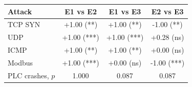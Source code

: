 \begin{tabular}{lccc}
\toprule
Attack & E1 vs E2 & E1 vs E3 & E2 vs E3\\
\midrule
TCP SYN & +1.00 (**) & +1.00 (**) & -1.00 (**)\\
UDP & +1.00 (***) & +1.00 (***) & +0.28 (ns)\\
ICMP & +1.00 (**) & +1.00 (**) & +0.00 (ns)\\
Modbus & +1.00 (***) & +0.00 (ns) & -1.00 (***)\\
\midrule
PLC crashes, $p$ & 1.000 & 0.087 & 0.087\\
\bottomrule
\end{tabular}
